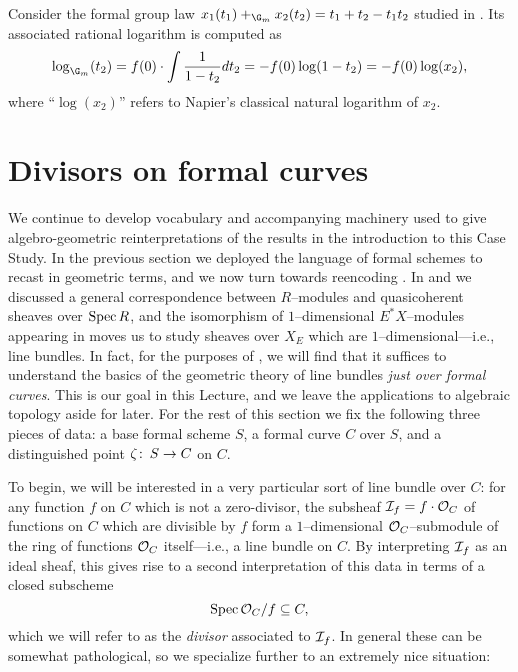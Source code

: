 \begin{example}\label{GmAndItsLogExample}
Consider the formal group law $x_1(t_1) +_{\G_m} x_2(t_2) = t_1 + t_2 - t_1 t_2$ studied in .  Its associated rational logarithm is computed as \[\log_{\G_m}(t_2) = f(0) \cdot \int \frac{1}{1 - t_2} dt_2 = -f(0) \log(1 - t_2) = -f(0) \log(x_2),\] where ``$\log(x_2)$'' refers to Napier's classical natural logarithm of $x_2$.
\end{example}









\section{Divisors on formal curves}\label{CurveDivisorsSection}

We continue to develop vocabulary and accompanying machinery used to give algebro-geometric reinterpretations of the results in the introduction to this Case Study.  In the previous section we deployed the language of formal schemes to recast  in geometric terms, and we now turn towards reencoding .  In  and  we discussed a general correspondence between $R$--modules and quasicoherent sheaves over $\operatorname{Spec} R$, and the isomorphism of $1$--dimensional $E^* X$--modules appearing in  moves us to study sheaves over $X_E$ which are $1$--dimensional---i.e., line bundles.  In fact, for the purposes of , we will find that it suffices to understand the basics of the geometric theory of line bundles \emph{just over formal curves}.  This is our goal in this Lecture, and we leave the applications to algebraic topology aside for later.  For the rest of this section we fix the following three pieces of data: a base formal scheme $S$, a formal curve $C$ over $S$, and a distinguished point $\zeta\colon\thinspace S \to C$ on $C$.

To begin, we will be interested in a very particular sort of line bundle over $C$: for any function $f$ on $C$ which is not a zero-divisor, the subsheaf $\mathcal{I}_f = f \cdot \mathcal{O}_C$ of functions on $C$ which are divisible by $f$ form a $1$--dimensional $\mathcal{O}_C$--submodule of the ring of functions $\mathcal{O}_C$ itself---i.e., a line bundle on $C$.  By interpreting $\mathcal{I}_f$ as an ideal sheaf, this gives rise to a second interpretation of this data in terms of a closed subscheme \[\operatorname{Spec} \mathcal{O}_C / f \subseteq C,\] which we will refer to as the \textit{divisor} associated to $\mathcal{I}_f$.  In general these can be somewhat pathological, so we specialize further to an extremely nice situation:

